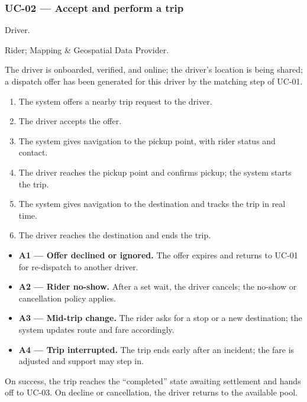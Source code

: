 \subsubsection*{UC-02 --- Accept and perform a trip}

\begin{description}[leftmargin=2.4cm,style=nextline,font=\normalfont\bfseries]
  \item[Primary actor] Driver.
  \item[Secondary actors] Rider; Mapping \& Geospatial Data Provider.
  \item[Preconditions] The driver is onboarded, verified, and online; the
        driver's location is being shared; a dispatch offer has been
        generated for this driver by the matching step of UC-01.
  \item[Main flow]
    \begin{enumerate}[leftmargin=1.6em,itemsep=0.15em]
      \item The system offers a nearby trip request to the driver.
      \item The driver accepts the offer.
      \item The system gives navigation to the pickup point, with rider
            status and contact.
      \item The driver reaches the pickup point and confirms pickup; the
            system starts the trip.
      \item The system gives navigation to the destination and tracks the
            trip in real time.
      \item The driver reaches the destination and ends the trip.
    \end{enumerate}
  \item[Alternative flows]
    \begin{itemize}[leftmargin=1.6em,itemsep=0.15em]
      \item \textbf{A1 --- Offer declined or ignored.} The offer expires and
            returns to UC-01 for re-dispatch to another driver.
      \item \textbf{A2 --- Rider no-show.} After a set wait, the driver
            cancels; the no-show or cancellation policy applies.
      \item \textbf{A3 --- Mid-trip change.} The rider asks for a stop or a
            new destination; the system updates route and fare accordingly.
      \item \textbf{A4 --- Trip interrupted.} The trip ends early after an
            incident; the fare is adjusted and support may step in.
    \end{itemize}
  \item[Postconditions] On success, the trip reaches the ``completed'' state
        awaiting settlement and hands off to UC-03. On decline or
        cancellation, the driver returns to the available pool.
\end{description}

